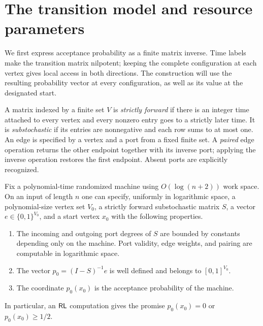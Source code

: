 \section{The transition model and resource parameters}\label{sec:model}

We first express acceptance probability as a finite matrix inverse.
Time labels make the transition matrix nilpotent; keeping the complete
configuration at each vertex gives local access in both directions.
The construction will use the resulting probability vector at every
configuration, as well as its value at the designated start.

A matrix indexed by a finite set $V$ is \emph{strictly forward} if
there is an integer time attached to every vertex and every nonzero
entry goes to a strictly later time. It is \emph{substochastic} if its
entries are nonnegative and each row sums to at most one. An edge is
specified by a vertex and a port from a fixed finite set. A \emph{paired}
edge operation returns the other endpoint together with its inverse
port; applying the inverse operation restores the first endpoint.
Absent ports are explicitly recognized.

\begin{lemma}\label{lem:model-reduction}
Fix a polynomial-time randomized machine using $O(\log(n+2))$ work
space. On an input of length $n$ one can specify, uniformly in
logarithmic space, a polynomial-size vertex set $V_0$, a strictly
forward substochastic matrix $S$, a vector
$e\in\{0,1\}^{V_0}$, and a start vertex $x_0$ with the following
properties.
\begin{enumerate}
\item The incoming and outgoing port degrees of $S$ are bounded by
constants depending only on the machine. Port validity, edge weights,
and pairing are computable in logarithmic space.
\item The vector $p_0=(I-S)^{-1}e$ is well defined and belongs to
$[0,1]^{V_0}$.
\item The coordinate $p_0(x_0)$ is the acceptance probability of
the machine.
\end{enumerate}
In particular, an $\mathsf{RL}$ computation gives the promise
$p_0(x_0)=0$ or $p_0(x_0)\ge1/2$.
\end{lemma}

